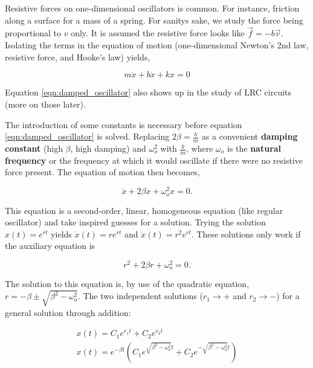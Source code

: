 
Resistive forces on one-dimensional oscillators is common. For instance, friction along a surface for a mass of a spring. For sanitys sake, we study the force being proportional to $v$ only. It is assumed the resistive force looks like $\vec{f} = -b\vec{v}$. Isolating the terms in the equation of motion (one-dimensional Newton's 2nd law, resistive force, and Hooke's law) yields,

\begin{equation}
    m\ddot{x} + b\dot{x} + kx = 0
    \label{eqn:damped_oscillator}
\end{equation}

Equation \ref{eqn:damped_oscillator} also shows up in the study of LRC circuits (more on those later).

The introduction of some constants is necessary before equation \ref{eqn:damped_oscillator} is solved. Replacing $2\beta = \frac{b}{m}$ as a convenient {\bfseries damping constant} (high $\beta$, high damping) and $\omega_o^2$ with $\frac{k}{m}$, where $\omega_o$ is the {\bfseries natural frequency} or the frequency at which it would oscillate if there were no resistive force present. The equation of motion then becomes,

\begin{equation}
    \ddot{x} + 2\beta \dot{x} + \omega_o^2 x = 0.
    \label{eqn:damped_oscillator2}
\end{equation}

This equation is a second-order, linear, homogeneous equation (like regular oscillator) and take inspired guesses for a solution. Trying the solution $x(t) = e^{rt}$ yields $\dot{x}(t) = re^{rt}$ and $\ddot{x}(t) = r^2e^{rt}$. These solutions only work if the auxiliary equation is

\begin{equation*}
    r^2 + 2\beta r + \omega_o^2 = 0.
\end{equation*}

The solution to this equation is, by use of the quadratic equation, $r = -\beta \pm \sqrt{\beta^2 - \omega_o^2}$. The two independent solutions ($r_1 \rightarrow +$ and $r_2 \rightarrow -$) for a general solution through addition:

\begin{gather*}
    x(t) = C_1 e^{r_1 t} + C_2 e^{r_2 t} \\
    x(t) = e^{-\beta t} (C_1 e^{\sqrt{\beta^2 - \omega_o^2}t} + C_2 e^{-\sqrt{\beta^2 - \omega_o^2}t})
\end{gather*}

